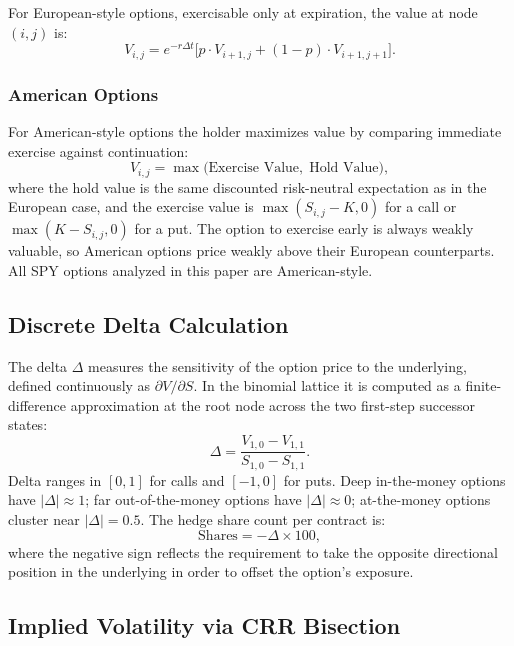 \documentclass[10pt,twocolumn]{article}
\begin{document}
For European-style options, exercisable only at expiration, the value at
node $(i,j)$ is:
%
\begin{equation}
V_{i,j} = e^{-r\Delta t}\bigl[p\cdot V_{i+1,j}
          + (1-p)\cdot V_{i+1,j+1}\bigr].
\end{equation}

\subsubsection{American Options}

For American-style options the holder maximizes value by comparing immediate
exercise against continuation:
%
\begin{equation}
V_{i,j} = \max\bigl(\text{Exercise Value},\;\text{Hold Value}\bigr),
\end{equation}
%
where the hold value is the same discounted risk-neutral expectation as in
the European case, and the exercise value is $\max(S_{i,j}-K,0)$ for a call
or $\max(K-S_{i,j},0)$ for a put. The option to exercise early is always
weakly valuable, so American options price weakly above their European
counterparts. All SPY options analyzed in this paper are American-style.

\subsection{Discrete Delta Calculation}

The delta $\Delta$ measures the sensitivity of the option price to the
underlying, defined continuously as $\partial V / \partial S$. In the
binomial lattice it is computed as a finite-difference approximation at the
root node across the two first-step successor states:
%
\begin{equation}
\Delta = \frac{V_{1,0} - V_{1,1}}{S_{1,0} - S_{1,1}}.
\end{equation}
%
Delta ranges in $[0,1]$ for calls and $[-1,0]$ for puts. Deep in-the-money
options have $|\Delta| \approx 1$; far out-of-the-money options have
$|\Delta| \approx 0$; at-the-money options cluster near $|\Delta| = 0.5$.
The hedge share count per contract is:
%
\begin{equation}
\text{Shares} = -\Delta \times 100,
\end{equation}
%
where the negative sign reflects the requirement to take the opposite
directional position in the underlying in order to offset the option's
exposure.

\subsection{Implied Volatility via CRR Bisection}
\end{document}
